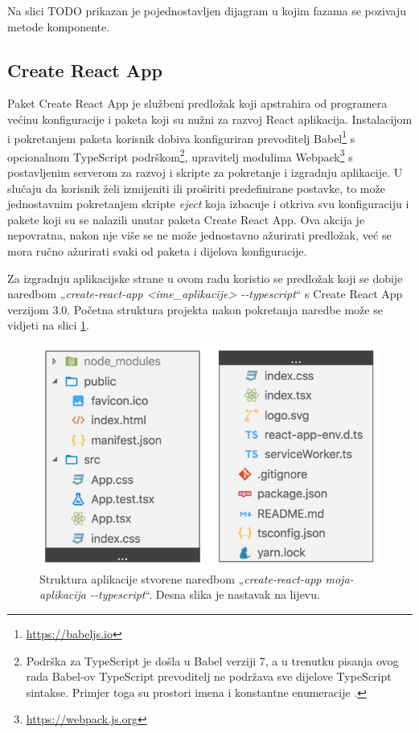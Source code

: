 \documentclass[times, utf8, diplomski, numeric]{fer}
\newcommand{\razmakp}{\vspace{18pt}}
\newcommand{\razmaks}{\vspace{10pt}}
\begin{document}
Na slici TODO prikazan je pojednostavljen dijagram u kojim fazama se pozivaju metode komponente.


\razmaks
\subsection{Create React App} \label{sec:cra}

Paket Create React App je službeni predložak koji apstrahira od programera većinu konfiguracije i paketa koji su nužni za razvoj React aplikacija.
Instalacijom i pokretanjem paketa korisnik dobiva konfiguriran prevoditelj Babel\footnote{\url{https://babeljs.io}} s opcionalnom TypeScript podrškom\footnote{
    Podrška za TypeScript je došla u Babel verziji 7, a u trenutku pisanja ovog rada Babel-ov TypeScript prevoditelj ne podržava sve dijelove TypeScript sintakse. Primjer toga su prostori imena  i konstantne enumeracije \citep{ms_dev_babel}.
}, upravitelj modulima Webpack\footnote{\url{https://webpack.js.org}} s postavljenim serverom za razvoj i skripte za pokretanje i izgradnju aplikacije.
U slučaju da korisnik želi izmijeniti ili proširiti predefinirane postavke, to može jednostavnim pokretanjem skripte \emph{eject} koja izbacuje i otkriva svu konfiguraciju i pakete koji su se nalazili unutar paketa Create React App.
Ova akcija je nepovratna, nakon nje više se ne može jednostavno ažurirati predložak, već se mora ručno ažurirati svaki od paketa i dijelova konfiguracije\citep{gh_cra}.

\razmakp

Za izgradnju aplikacijske strane u ovom radu koristio se predložak koji se dobije naredbom „\emph{create-react-app <ime\_aplikacije> -{}-typescript}“ s Create React App verzijom 3.0.
Početna struktura projekta nakon pokretanja naredbe može se vidjeti na slici \ref{fig:cra}.

\razmaks
\begin{figure}[!htb] %
    \centering
    \includegraphics[width=12cm]{images/cra.png}
    \caption{Struktura aplikacije stvorene naredbom „\emph{create-react-app moja-aplikacija -{}-typescript}“. Desna slika je nastavak na lijevu.}
    \label{fig:cra}
\end{figure}
\end{document}

